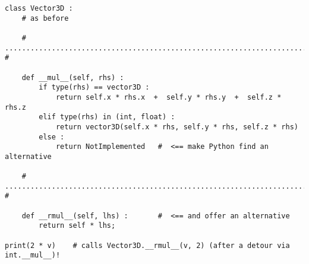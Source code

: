 
\begin{frame}[fragile]
%
\begin{codebox}
\begin{verbatim}
class Vector3D :
    # as before
    
    # ........................................................................ #
    
    def __mul__(self, rhs) :
        if type(rhs) == vector3D :
            return self.x * rhs.x  +  self.y * rhs.y  +  self.z * rhs.z
        elif type(rhs) in (int, float) :
            return vector3D(self.x * rhs, self.y * rhs, self.z * rhs)
        else :
            return NotImplemented   #  <== make Python find an alternative
    
    # ........................................................................ #
    
    def __rmul__(self, lhs) :       #  <== and offer an alternative
        return self * lhs;

print(2 * v)    # calls Vector3D.__rmul__(v, 2) (after a detour via int.__mul__)!
\end{verbatim}
\end{codebox}
%
\end{frame}


